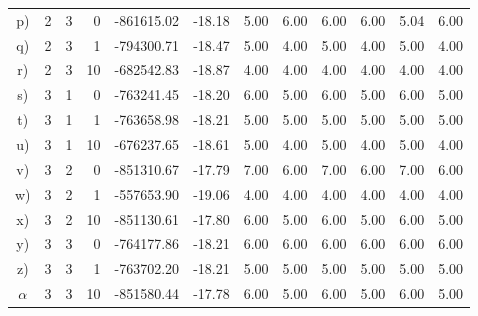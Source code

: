 \documentclass[10pt]{article} %
\begin{document}
\begin{table}[H]
\begin{tabular}{crrrrrrrrrrr}
  \hline
  p) &   2 &   3 &   0 & -861615.02 & -18.18 & 5.00 & 6.00 & 6.00 & 6.00 & 5.04 & 6.00 \\
  q) &   2 &   3 &   1 & -794300.71 & -18.47 & 5.00 & 4.00 & 5.00 & 4.00 & 5.00 & 4.00 \\
  r) &   2 &   3 &  10 & -682542.83 & -18.87 & 4.00 & 4.00 & 4.00 & 4.00 & 4.00 & 4.00 \\
  \hline\hline
  s) &   3 &   1 &   0 & -763241.45 & -18.20 & 6.00 & 5.00 & 6.00 & 5.00 & 6.00 & 5.00 \\
  t) &   3 &   1 &   1 & -763658.98 & -18.21 & 5.00 & 5.00 & 5.00 & 5.00 & 5.00 & 5.00 \\
  u) &   3 &   1 &  10 & -676237.65 & -18.61 & 5.00 & 4.00 & 5.00 & 4.00 & 5.00 & 4.00 \\
  \hline
  v) &   3 &   2 &   0 & -851310.67 & -17.79 & 7.00 & 6.00 & 7.00 & 6.00 & 7.00 & 6.00 \\
  w) &   3 &   2 &   1 & -557653.90 & -19.06 & 4.00 & 4.00 & 4.00 & 4.00 & 4.00 & 4.00 \\
  x) &   3 &   2 &  10 & -851130.61 & -17.80 & 6.00 & 5.00 & 6.00 & 5.00 & 6.00 & 5.00 \\
  \hline
  y) &   3 &   3 &   0 & -764177.86 & -18.21 & 6.00 & 6.00 & 6.00 & 6.00 & 6.00 & 6.00 \\
  z) &   3 &   3 &   1 & -763702.20 & -18.21 & 5.00 & 5.00 & 5.00 & 5.00 & 5.00 & 5.00 \\
  $\alpha$ &   3 &   3 &  10 & -851580.44 & -17.78 & 6.00 & 5.00 & 6.00 & 5.00 & 6.00 & 5.00 \\
  \hline
\end{tabular}
\end{table}


% 
\end{document}
